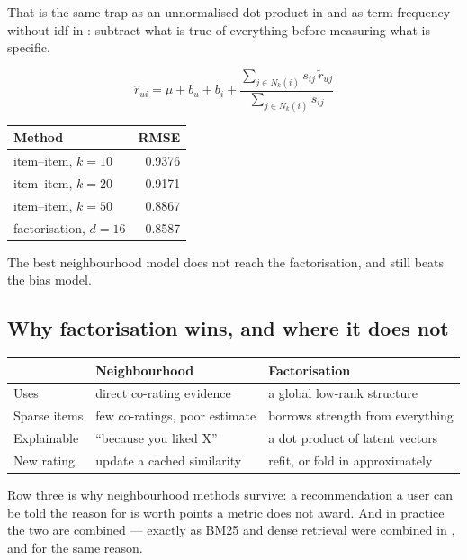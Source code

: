 \documentclass[11pt,a4paper]{article}
\begin{document}
That is the same trap as an unnormalised dot product in  and as
term frequency without idf in : subtract what is true of everything
before measuring what is specific.

\[
  \hat r_{ui} = \mu + b_u + b_i +
  \frac{\sum_{j\in N_k(i)} s_{ij}\,\tilde r_{uj}}{\sum_{j\in N_k(i)} s_{ij}}
\]

\begin{center}
\small
\begin{tabular}{lr}
\toprule
\textbf{Method} & \textbf{RMSE} \\
\midrule
item--item, $k = 10$        & 0.9376 \\
item--item, $k = 20$        & 0.9171 \\
item--item, $k = 50$        & 0.8867 \\
factorisation, $d = 16$     & 0.8587 \\
\bottomrule
\end{tabular}
\end{center}

The best neighbourhood model does not reach the factorisation, and still beats
the bias model.

\subsection{Why factorisation wins, and where it does not}

\begin{center}
\small
\begin{tabular}{p{}p{}p{}}
\toprule
 & \textbf{Neighbourhood} & \textbf{Factorisation} \\
\midrule
Uses         & direct co-rating evidence & a global low-rank structure \\
Sparse items & few co-ratings, poor estimate & borrows strength from
everything \\
Explainable  & ``because you liked X'' & a dot product of latent vectors \\
New rating   & update a cached similarity & refit, or fold in approximately \\
\bottomrule
\end{tabular}
\end{center}

Row three is why neighbourhood methods survive: a recommendation a user can be
told the reason for is worth points a metric does not award. And in practice
the two are combined --- exactly as BM25 and dense retrieval were combined in
, and for the same reason.
\end{document}
